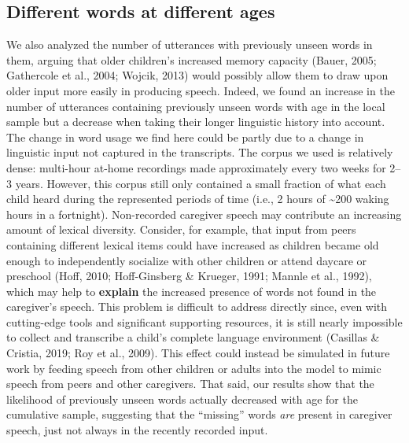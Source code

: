 \documentclass[
  english,
  man,mask,floatsintext]{apa6}
\begin{document}
\hypertarget{different-words-at-different-ages}{%
\subsection{Different words at different ages}\label{different-words-at-different-ages}}

We also analyzed the number of utterances with previously unseen words in them, arguing that older children's increased memory capacity (Bauer, 2005; Gathercole et al., 2004; Wojcik, 2013) would possibly allow them to draw upon older input more easily in producing speech. Indeed, we found an increase in the number of utterances containing previously unseen words with age in the local sample but a decrease when taking their longer linguistic history into account. The change in word usage we find here could be partly due to a change in linguistic input not captured in the transcripts. The corpus we used is relatively dense: multi-hour at-home recordings made approximately every two weeks for 2--3 years. However, this corpus still only contained a small fraction of what each child heard during the represented periods of time (i.e., 2 hours of \textasciitilde200 waking hours in a fortnight). Non-recorded caregiver speech may contribute an increasing amount of lexical diversity. Consider, for example, that input from peers containing different lexical items could have increased as children became old enough to independently socialize with other children or attend daycare or preschool (Hoff, 2010; Hoff-Ginsberg \& Krueger, 1991; Mannle et al., 1992), which may help to \textbf{explain} the increased presence of words not found in the caregiver's speech. This problem is difficult to address directly since, even with cutting-edge tools and significant supporting resources, it is still nearly impossible to collect and transcribe a child's complete language environment (Casillas \& Cristia, 2019; Roy et al., 2009). This effect could instead be simulated in future work by feeding speech from other children or adults into the model to mimic speech from peers and other caregivers. That said, our results show that the likelihood of previously unseen words actually decreased with age for the cumulative sample, suggesting that the \enquote{missing} words \emph{are} present in caregiver speech, just not always in the recently recorded input.
\end{document}
